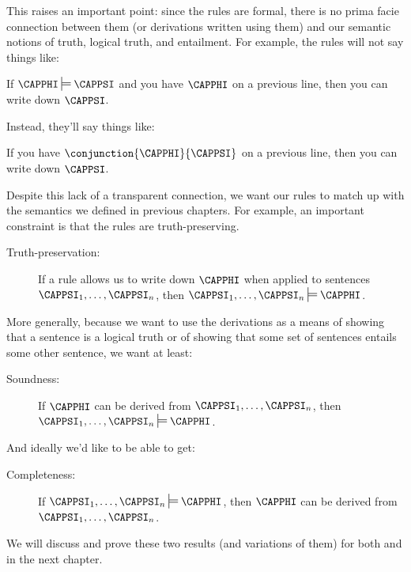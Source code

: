 This raises an important point: since the rules are formal, there is no prima facie connection between them (or derivations written using them) and our semantic notions of truth, logical truth, and entailment. 
For example, the rules will not say things like: 
\begin{RESTARTmenumerate}
\item If $\CAPPHI\sdtstile{}{}\CAPPSI$ and you have $\CAPPHI$ on a previous line, then you can write down $\CAPPSI$. 
\end{RESTARTmenumerate}
Instead, they'll say things like: 
\begin{menumerate}
\item If you have $\conjunction{\CAPPHI}{\CAPPSI}$ on a previous line, then you can write down $\CAPPSI$.
\end{menumerate} 
Despite this lack of a transparent connection, we want our rules to match up with the semantics we defined in previous chapters. 
For example, an important constraint is that the rules are truth-preserving. 
\begin{description}
\item[Truth-preservation:] If a rule allows us to write down $\CAPPHI$ when applied to sentences $\CAPPSI_1,\ldots,\CAPPSI_{\integer{n}}$, then $\CAPPSI_1,\ldots,\CAPPSI_{\integer{n}}\sdtstile{}{}\CAPPHI$. 
\end{description} 
More generally, because we want to use the derivations as a means of showing that a sentence is a logical truth or of showing that some set of sentences entails some other sentence, we want at least:
\begin{description}
\item[Soundness:] If $\CAPPHI$ can be derived from $\CAPPSI_1,\ldots,\CAPPSI_{\integer{n}}$, then $\CAPPSI_1,\ldots,\CAPPSI_{\integer{n}}\sdtstile{}{}\CAPPHI$.
\end{description} 
\noindent{}And ideally we'd like to be able to get:
\begin{description}
\item[Completeness:] If $\CAPPSI_1,\ldots,\CAPPSI_{\integer{n}}\sdtstile{}{}\CAPPHI$, then $\CAPPHI$ can be derived from $\CAPPSI_1,\ldots,\CAPPSI_{\integer{n}}$.
\end{description}

We will discuss and prove these two results (and variations of them) for both \GSL{} and \GQL{} in the next chapter.

